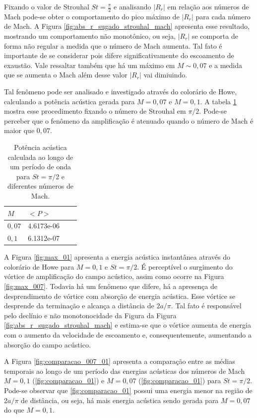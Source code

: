 Fixando o valor de Strouhal $St = \frac{\pi}{2}$ e analisando $|R_{r}|$ em relação aos números de Mach pode-se obter o comportamento do pico máximo de $|R_{r}|$ para cada número de Mach. A Figura \ref{fig:abs_r_sugado_strouhal_mach} apresenta esse resultado, mostrando um comportamento não monotônico, ou seja, $|R_{r}|$ se comporta de forma não regular a medida que o número de Mach aumenta. Tal fato é importante de se considerar pois difere significativamente do escoamento de exaustão. Vale ressaltar também que há um máximo em $M \sim 0,07$ e a medida que se aumenta o Mach além desse valor $|R_{r}|$ vai dimiuindo.

Tal fenômeno pode ser analisado e investigado através do colorário de Howe, calculando a potência acústica gerada para $M = 0,07$ e $M = 0,1$. A tabela \ref{table:potencia_mach} mostra esse procedimento fixando o número de Strouhal em $\pi/2$. Pode-se perceber que o fenômeno da amplificação é atenuado quando o número de Mach é maior que $0,07$.    

\begin{table}[ht!]
\centering
\caption{Potência acústica calculada ao longo de um período de onda para $St = \pi/2$ e diferentes números de Mach.}
\label{table:potencia_mach}
    \begin{tabular}{|l|l|l|l|}
        \hline
        $M$ & $<P>$ \\ \hline
        $0,07$ & 4.6173e-06  \\ \hline  
        $0,1$ & 6.1312e-07 \\ \hline
    \end{tabular}
\end{table}

\newpage

A Figura \ref{fig:max_01} apresenta a energia acústica instantânea através do colorário de Howe para $M = 0,1$ e $St = \pi/2$. É perceptível o surgimento do vórtice de amplificação do campo acústico, assim como ocorre na Figura \ref{fig:max_007}. Todavia há um fenômeno que difere, há a apresença de desprendimento de vórtice com absorção de energia acústica. Esse vórtice se desprende da terminação e alcança a distância de $2a/\pi$. Tal fato é responsável pelo declínio e não monotonocidade da Figura da Figura \ref{fig:abs_r_sugado_strouhal_mach} e estima-se que o vórtice aumenta de energia com o aumento da velocidade de escoamento e, consequentemente, aumentando a absorção do campo acústico.

A Figura \ref{fig:comparacao_007_01} apresenta a comparação entre as médias temporais ao longo de um período das energias acústicas dos números de Mach $M = 0,1$ (\ref{fig:comparacao_01}) e $M = 0,07$ (\ref{fig:comparacao_01}) para $St = \pi/2$. Pode-se observar que \ref{fig:comparacao_01} possui uma energia menor na região de $2a/\pi$ de distância, ou seja, há mais energia acústica sendo gerada para $M = 0,07$ do que $M = 0,1$.    


